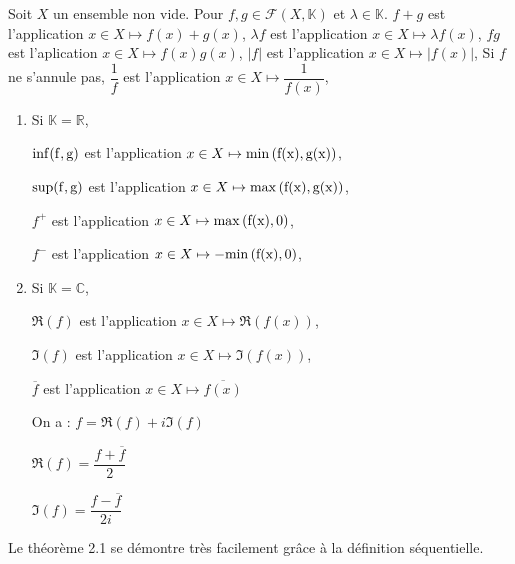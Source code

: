 \documentclass[12pt,a4paper]{report}
\begin{document}
\begin{tcolorbox}[colback=gray!5!white,colframe=gray!75!black,title=Parenthèse - Opérations sur les fonctions à valeurs dans $\mathbb{R}$ ou $\mathbb{C}$]
Soit $X$ un ensemble non vide. Pour $f,g \in \mathcal{F}(X,\mathbb{K})$ et $\lambda \in \mathbb{K}$.
\newline $f+g$ est l'application $x \in X \mapsto f(x) + g(x)$,
\newline $\lambda f$ est l'application $x \in X \mapsto \lambda f(x)$,
\newline $fg$ est l'aplication $x \in X \mapsto f(x)g(x)$,
\newline $\lvert f \rvert$ est l'application $x \in X \mapsto \lvert f(x) \rvert$,
\newline Si $f$ ne s'annule pas, $\dfrac{1}{f}$ est l'application $x \in X \mapsto \dfrac{1}{f(x)}$,
\begin{enumerate}
\item Si $\mathbb{K} = \mathbb{R}$,
\par $\rm{inf}(f,g)$ est l'application $x \in X \mapsto \rm{min}\left(f(x),g(x)\right)$,
\par $\rm{sup}(f,g)$ est l'application $x \in X \mapsto \rm{max}\left(f(x),g(x)\right)$,
\par $f^+$ est l'application $x \in X \mapsto \rm{max}\left(f(x),0\right)$,
\par $f^-$ est l'application $x \in X \mapsto - \rm{min}\left(f(x),0\right)$,
\item Si $\mathbb{K} = \mathbb{C}$,
\par $\Re(f)$ est l'application $x \in X \mapsto \Re\left(f(x)\right)$,
\par $\Im(f)$ est l'application $x \in X \mapsto \Im\left(f(x)\right)$,
\par $\overline{f}$ est l'application $x \in X \mapsto \overline{f(x)}$
\par On a : $f = \Re(f) + i \Im(f)$
\par $\Re(f) = \dfrac{f + \overline{f}}{2}$
\par $\Im(f) = \dfrac{f - \overline{f}}{2i}$

\end{enumerate}
\end{tcolorbox}

Le théorème 2.1 se démontre très facilement grâce à la définition séquentielle.\\

\begin{principedemo}{}

\end{principedemo}
\end{document}
